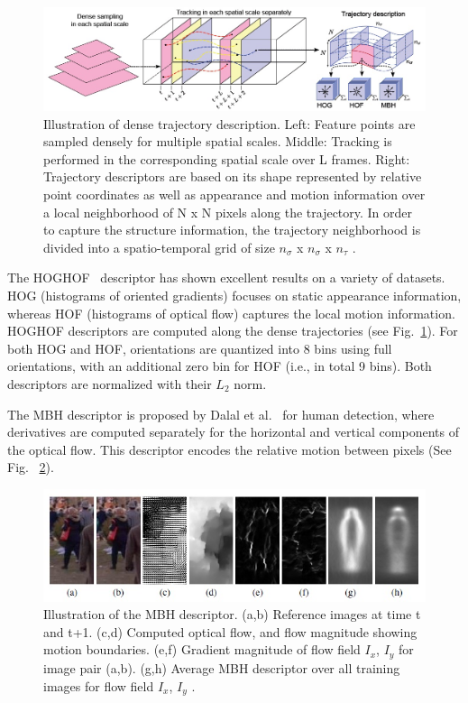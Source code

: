 \begin{figure}[!h]
	\centering
	\includegraphics[width=1\textwidth]{densetrack_descriptor.jpg}
	\caption{Illustration of dense trajectory description. Left: Feature points are sampled densely for multiple spatial scales. Middle: Tracking is performed in the corresponding spatial scale over L frames. Right: Trajectory descriptors are based on its shape represented by relative point coordinates as well as appearance and motion information over a local neighborhood of N x N pixels along the trajectory. In order to capture the structure information, the trajectory neighborhood is divided into a spatio-temporal grid of size $n_{\sigma}$ x $n_{\sigma}$ x $n_{\tau}$ \cite{wang:2011:inria-00583818:1}.}
	\label{densetrack_descriptor}
\end{figure}

The HOGHOF~\cite{Laptev03space-timeinterest} descriptor has shown excellent results on a variety of datasets. HOG (histograms of oriented gradients) focuses on static appearance information, whereas HOF (histograms of optical flow) captures the local motion information. HOGHOF descriptors are computed along the dense trajectories (see Fig.~\ref{densetrack_descriptor}). For both HOG and HOF, orientations are quantized into 8 bins using full orientations, with an additional zero bin for HOF (i.e., in total 9 bins). Both descriptors are normalized with their $L_{2}$ norm.

The MBH descriptor is proposed by Dalal et al.~\cite{Dalal06ECCV} for human detection, where derivatives are computed separately
for the horizontal and vertical components of the optical flow. This descriptor encodes the relative motion between pixels (See Fig. ~\ref{mbh_descriptor}).
\begin{figure}[!h]
	\centering
	\includegraphics[width=1\textwidth]{mbh_descriptor.jpg}
	\caption{Illustration of the MBH descriptor. (a,b) Reference images at time t and t+1. (c,d) Computed optical flow, and flow magnitude showing motion boundaries. (e,f) Gradient magnitude of flow field $I_{x}$, $I_{y}$ for image pair (a,b). (g,h) Average MBH descriptor over all training images for flow field $I_{x}$, $I_{y}$ \cite{Dalal06ECCV}. }
	\label{mbh_descriptor}
\end{figure}

